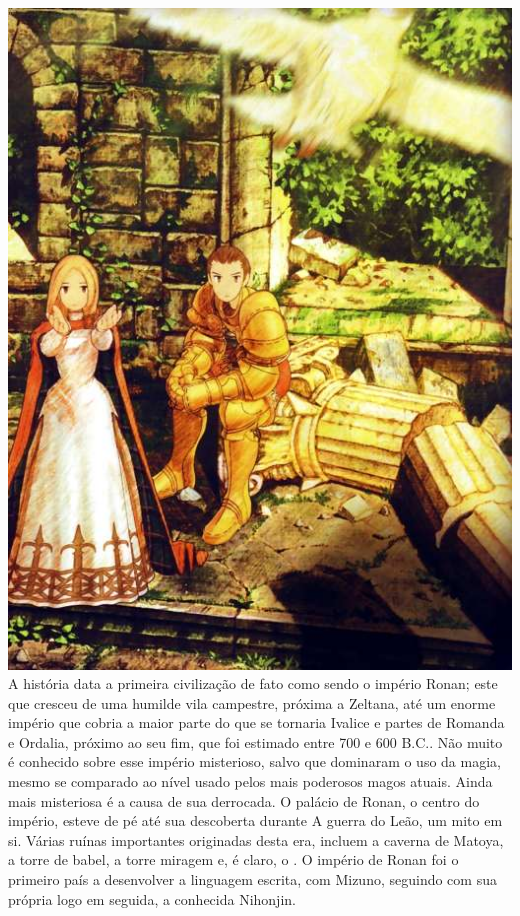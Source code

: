 \includegraphics[width=\columnwidth]{./art/worldbook/ovelia.jpg}
\ofpar
%
\\
A história data a primeira civilização de fato como sendo o império Ronan; este que cresceu de uma humilde vila campestre, próxima a Zeltana, até um enorme império que cobria a maior parte do que se tornaria Ivalice e partes de Romanda e Ordalia, próximo ao seu fim, que foi estimado entre 700 e 600 B.C..
Não muito é conhecido sobre esse império misterioso, salvo que dominaram o uso da magia, mesmo se comparado ao nível usado pelos mais poderosos magos atuais.
Ainda mais misteriosa é a causa de sua derrocada.
O palácio de Ronan, o centro do império, esteve de pé até sua descoberta durante A guerra do Leão, um mito em si.
Várias ruínas importantes originadas desta era, incluem a caverna de Matoya, a torre de babel, a torre miragem e, é claro, o .
O império de Ronan foi o primeiro país a desenvolver a linguagem escrita, com Mizuno, seguindo com sua própria logo em seguida, a conhecida Nihonjin.
